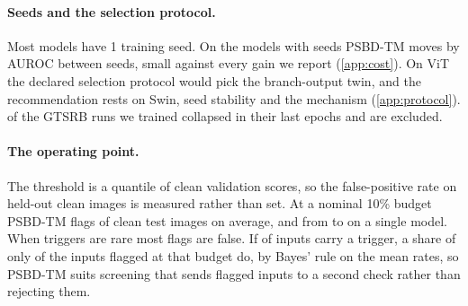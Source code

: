 \paragraph{Seeds and the selection protocol.}
Most models have 1 training seed. On the \SeedCells{} models with \SeedsPerCell{} seeds PSBD-TM moves by \SeedSdRecommended{} AUROC between seeds, small against every gain we report (\cref{app:cost}). On ViT the declared selection protocol would pick the branch-output twin, and the recommendation rests on Swin, seed stability and the mechanism (\cref{app:protocol}). \GtsrbDivergedRuns{} of the \GtsrbRunsScored{} GTSRB runs we trained collapsed in their last epochs and are excluded.

\paragraph{The operating point.}
The threshold is a quantile of clean validation scores, so the false-positive rate on held-out clean images is measured rather than set. At a nominal 10\% budget PSBD-TM flags \RealizedFprOneZero{} of clean test images on average, and from \RealizedFprOneZeroMin{} to \RealizedFprOneZeroMax{} on a single model. When triggers are rare most flags are false. If \DeploymentPrevalence{} of inputs carry a trigger, a share of only \PrecisionOneZero{} of the inputs flagged at that budget do, by Bayes' rule on the mean rates, so PSBD-TM suits screening that sends flagged inputs to a second check rather than rejecting them.
